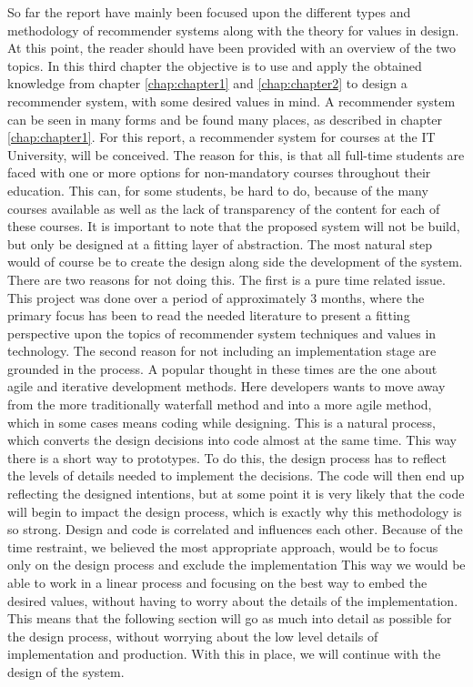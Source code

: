 So far the report have mainly been focused upon the different types and methodology of recommender systems along with the theory for values in design. At this point, the reader should have been provided with an overview of the two topics. In this third chapter the objective is to use and apply the obtained knowledge from chapter \ref{chap:chapter1} and \ref{chap:chapter2} to design a recommender system, with some desired values in mind.\newline 
A recommender system can be seen in many forms and be found many places, as described in chapter \ref{chap:chapter1}. For this report, a recommender system for courses at the IT University, will be conceived. The reason for this, is that all full-time students are faced with one or more options for non-mandatory courses throughout their education. This can, for some students, be hard to do, because of the many courses available as well as the lack of transparency of the content for each of these courses.\newline
It is important to note that the proposed system will not be build, but only be designed at a fitting layer of abstraction. The most natural step would of course be to create the design along side the development of the system. There are two reasons for not doing this. The first is a pure time related issue. This project was done over a period of approximately 3 months, where the primary focus has been to read the needed literature to present a fitting perspective upon the topics of recommender system techniques and values in technology. The second reason for not including an implementation stage are grounded in the process. A popular thought in these times are the one about agile and iterative development methods. Here developers wants to move away from the more traditionally waterfall method and into a more agile method, which in some cases means coding while designing. This is a natural process, which converts the design decisions into code almost at the same time. This way there is a short way to prototypes. To do this, the design process has to reflect the levels of details needed to implement the decisions. The code will then end up reflecting the designed intentions, but at some point it is very likely that the code will begin to impact the design process, which is exactly why this methodology is so strong. Design and code is correlated and influences each other. Because of the time restraint, we believed the most appropriate approach, would be to focus only on the design process and exclude the implementation This way we would be able to work in a linear process and focusing on the best way to embed the desired values, without having to worry about the details of the implementation.\\
This means that the following section will go as much into detail as possible for the design process, without worrying about the low level details of implementation and production. With this in place, we will continue with the design of the system. 

